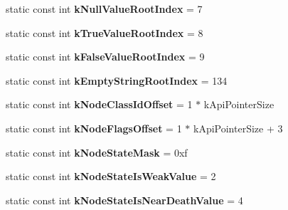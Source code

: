 \begin{DoxyCompactItemize}
\item 
\hypertarget{classv8_1_1internal_1_1_internals_ab311cf753ec5c968052bd83ef21e83f8}{}static const int {\bfseries k\+Null\+Value\+Root\+Index} = 7\label{classv8_1_1internal_1_1_internals_ab311cf753ec5c968052bd83ef21e83f8}

\item 
\hypertarget{classv8_1_1internal_1_1_internals_a93abd58b178eca469bade28e68b5c59e}{}static const int {\bfseries k\+True\+Value\+Root\+Index} = 8\label{classv8_1_1internal_1_1_internals_a93abd58b178eca469bade28e68b5c59e}

\item 
\hypertarget{classv8_1_1internal_1_1_internals_a90b6837aa368bbe4ffd914e6f753b167}{}static const int {\bfseries k\+False\+Value\+Root\+Index} = 9\label{classv8_1_1internal_1_1_internals_a90b6837aa368bbe4ffd914e6f753b167}

\item 
\hypertarget{classv8_1_1internal_1_1_internals_a6f669f3d98fe653b281b26be3bc0655a}{}static const int {\bfseries k\+Empty\+String\+Root\+Index} = 134\label{classv8_1_1internal_1_1_internals_a6f669f3d98fe653b281b26be3bc0655a}

\item 
\hypertarget{classv8_1_1internal_1_1_internals_af4fb6d499cb87f03031ad4d6be6bcd8f}{}static const int {\bfseries k\+Node\+Class\+Id\+Offset} = 1 $\ast$ k\+Api\+Pointer\+Size\label{classv8_1_1internal_1_1_internals_af4fb6d499cb87f03031ad4d6be6bcd8f}

\item 
\hypertarget{classv8_1_1internal_1_1_internals_aee5606f2a44d43d8dafe344e0bb753ef}{}static const int {\bfseries k\+Node\+Flags\+Offset} = 1 $\ast$ k\+Api\+Pointer\+Size + 3\label{classv8_1_1internal_1_1_internals_aee5606f2a44d43d8dafe344e0bb753ef}

\item 
\hypertarget{classv8_1_1internal_1_1_internals_a853acc088978d38a5a69091cf857a46d}{}static const int {\bfseries k\+Node\+State\+Mask} = 0xf\label{classv8_1_1internal_1_1_internals_a853acc088978d38a5a69091cf857a46d}

\item 
\hypertarget{classv8_1_1internal_1_1_internals_a8a5d4cc92a6952c2a50922c77a606e68}{}static const int {\bfseries k\+Node\+State\+Is\+Weak\+Value} = 2\label{classv8_1_1internal_1_1_internals_a8a5d4cc92a6952c2a50922c77a606e68}

\item 
\hypertarget{classv8_1_1internal_1_1_internals_a18f3e757639b07bdabb8cda7dd4a8bdb}{}static const int {\bfseries k\+Node\+State\+Is\+Near\+Death\+Value} = 4\label{classv8_1_1internal_1_1_internals_a18f3e757639b07bdabb8cda7dd4a8bdb}


\end{DoxyCompactItemize}

